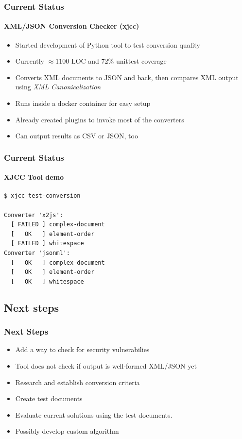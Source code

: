 \documentclass[
    alternativetitlepage=alternativ,
    cornerlogo=hgi_nds_logo2,
    sectionoverview,
]{rubpresentation}
\begin{document}
\begin{frame}
    \frametitle{Current Status}
    \framesubtitle{XML/JSON Conversion Checker (xjcc)}
    \begin{itemize}
        \item{} Started development of Python tool to test conversion quality
        \item{} Currently $\approx 1100$ LOC and 72\% unittest coverage
        \item{} Converts XML documents to JSON and back, then compares XML output using \emph{XML Canonicalization}
        \item{} Runs inside a docker container for easy setup
        \item{} Already created plugins to invoke most of the converters
        \item{} Can output results as CSV or JSON, too
    \end{itemize}
\end{frame}

\begin{frame}[fragile]
    \frametitle{Current Status}
    \framesubtitle{XJCC Tool demo}

    \begin{lstlisting}
$ xjcc test-conversion

Converter 'x2js':
  [ FAILED ] complex-document
  [   OK   ] element-order
  [ FAILED ] whitespace
Converter 'jsonml':
  [   OK   ] complex-document
  [   OK   ] element-order
  [   OK   ] whitespace
    \end{lstlisting}
\end{frame}

\subsection{Next steps}

\begin{frame}
    \frametitle{Next Steps}
    \begin{itemize}
        \item{} Add a way to check for security vulnerabilies
        \item{} Tool does not check if output is well-formed XML/JSON yet
        \item{} Research and establish conversion criteria
        \item{} Create test documents
        \item{} Evaluate current solutions using the test documents.
        \item{} Possibly develop custom algorithm
    \end{itemize}
\end{frame}
\end{document}
